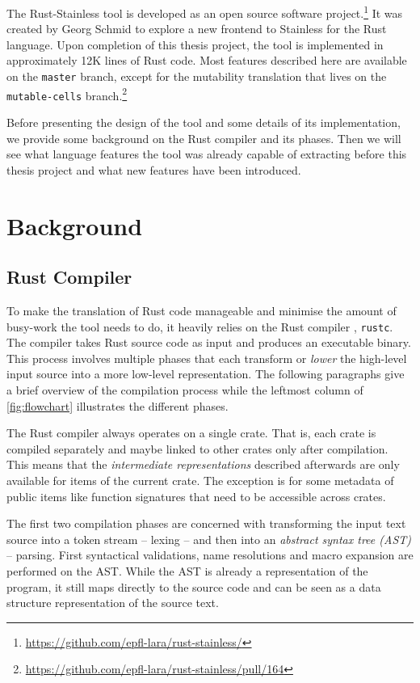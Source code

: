 The Rust-Stainless tool is developed as an open source software
project.\footnote{\url{https://github.com/epfl-lara/rust-stainless/}} It was
created by Georg Schmid to explore a new frontend to Stainless for the Rust
language. Upon completion of this thesis project, the tool is implemented in
approximately 12K lines of Rust code. Most features described here are available
on the \lstinline!master! branch, except for the mutability translation that
lives on the \lstinline!mutable-cells!
branch.\footnote{\url{https://github.com/epfl-lara/rust-stainless/pull/164}}

Before presenting the design of the tool and some details of its implementation,
we provide some  background on the Rust compiler and its phases. Then we will
see what language features the tool was already capable of extracting before
this thesis project and what new features have been introduced.


\section{Background}

\subsection{Rust Compiler}

To make the translation of Rust code manageable and minimise the amount of
busy-work the tool needs to do, it heavily relies on the Rust compiler
\cite{rustc-guide}, \passthrough{\lstinline!rustc!}. The compiler takes Rust
source code as input and produces an executable binary. This process involves
multiple phases that each transform or \emph{lower} the high-level input source
into a more low-level representation. The following paragraphs give  a brief
overview of the compilation process while the leftmost column of
\autoref{fig:flowchart} illustrates the different phases.

The Rust compiler always operates on a single crate. That is, each crate is
compiled separately and maybe linked to other crates only after compilation.
This means that the \emph{intermediate representations} described afterwards are
only available for items of the current crate. The exception is for some
metadata of public items like function signatures that need to be accessible
across crates.

The first two compilation phases are concerned with transforming the input text
source into a token stream -- lexing -- and then into an \emph{abstract syntax
tree (AST)} -- parsing. First syntactical validations, name resolutions and
macro expansion are performed on the AST. While the AST is already a
representation of the program, it still maps directly to the source code and can
be seen as a data structure representation of the source text.

